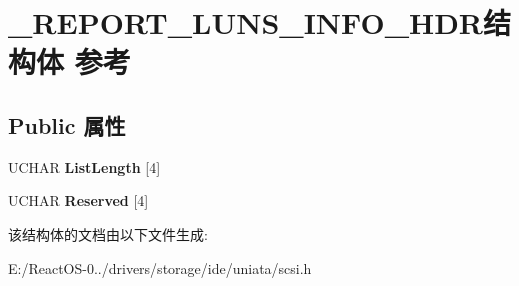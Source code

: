 \hypertarget{struct___r_e_p_o_r_t___l_u_n_s___i_n_f_o___h_d_r}{}\section{\+\_\+\+R\+E\+P\+O\+R\+T\+\_\+\+L\+U\+N\+S\+\_\+\+I\+N\+F\+O\+\_\+\+H\+D\+R结构体 参考}
\label{struct___r_e_p_o_r_t___l_u_n_s___i_n_f_o___h_d_r}
\subsection*{Public 属性}
\begin{DoxyCompactItemize}
\item 
\mbox{\label{struct___r_e_p_o_r_t___l_u_n_s___i_n_f_o___h_d_r_a3cd465347f4cb7645433ee566831e4d0}} 
U\+C\+H\+AR {\bfseries List\+Length} \mbox{[}4\mbox{]}
\item 
\mbox{\label{struct___r_e_p_o_r_t___l_u_n_s___i_n_f_o___h_d_r_ae3a06d7d97fb4ff4f83636f295902323}} 
U\+C\+H\+AR {\bfseries Reserved} \mbox{[}4\mbox{]}
\end{DoxyCompactItemize}


该结构体的文档由以下文件生成\+:\begin{DoxyCompactItemize}
\item 
E\+:/\+React\+O\+S-\/0../drivers/storage/ide/uniata/scsi.\+h\end{DoxyCompactItemize}
